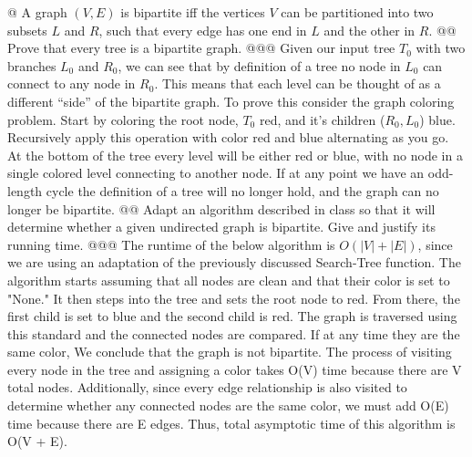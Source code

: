\documentclass[10pt]{article}
\begin{document}
\begin{easylist}[enumerate]
    @ A graph $(V, E)$ is bipartite iff the vertices $V$ can be partitioned into two subsets $L$ and $R$, such that
    every edge has one end in $L$ and the other in $R$.
    @@ Prove that every tree is a bipartite graph.
    @@@ Given our input tree $T_0$ with two branches $L_0$ and $R_0$, we can see that by definition of a tree no node in
    $L_0$ can connect to any node in $R_0$. This means that each level can be thought of as a different ``side'' of the
    bipartite graph. To prove this consider the graph coloring problem. Start by coloring the root node, $T_0$ red, and
    it's children ($R_0, L_0$) blue. Recursively apply this operation with color red and blue alternating as you go. At
    the bottom of the tree every level will be either red or blue, with no node in a single colored level connecting to
    another node. If at any point we have an odd-length cycle the definition of a tree will no longer hold, and the
    graph can no longer be bipartite.
    @@ Adapt an algorithm described in class so that it will determine whether a given undirected graph is bipartite.
    Give and justify its running time.
    @@@ The runtime of the below algorithm is $O(|V| + |E|)$, since we are using an adaptation of the previously
    discussed {\ttfamily Search-Tree} function.  The algorithm starts assuming that all nodes are clean and that their
    color is set to "None."  It then steps into the tree and sets the root node to red.  From there, the first child is
    set to blue and the second child is red.  The graph is traversed using this standard and the connected nodes are
    compared.  If at any time they are the same color, We conclude that the graph is not bipartite.  The process of
    visiting every node in the tree and assigning a color takes O(V) time because there are V total nodes.
    Additionally, since every edge relationship is also visited to determine whether any connected nodes are the same
    color, we must add O(E) time because there are E edges.  Thus, total asymptotic time of this algorithm is O(V + E).  


\end{easylist}
\end{document}
